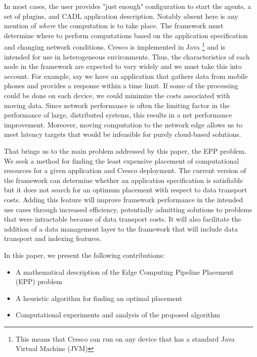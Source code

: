 \documentclass{article}
\begin{document}
    In most cases, the user provides "just enough" configuration to start the agents, a set of plugins, and CADL application description. Notably absent here is any mention of \textit{where} the computation is to take place. The framework must determine where to perform computations based on the application specification and changing network conditions. Cresco is implemented in Java \footnote{This means that Cresco can run on any device that has a standard Java Virtual Machine (JVM)}
    and is intended for use in heterogeneous environments. Thus, the characteristics of each node in the framework are expected to vary widely and we must take this into account. For example, say we have an application that gathers data from mobile phones and provides a response within a time limit. If some of the processing could be done on each device, we could minimize the costs associated with moving data. Since network performance is often the limiting factor in the performance of large, distributed systems, this results in a net performance improvement. Moreover, moving computation to the network edge allows us to meet latency targets that would be infeasible for purely cloud-based solutions.
    
    That brings us to the main problem addressed by this paper, the EPP problem.  We seek a method for finding the least expensive placement of computational resources for a given application and Cresco deployment. The current version of the framework can determine whether an application specification is satisfiable but it does not search for an optimum placement with respect to data transport costs. Adding this feature will improve framework performance in the intended use cases through increased efficiency, potentially admitting solutions to problems that were intractable because of data transport costs. It will also facilitate the addition of a data management layer to the framework that will include data transport and indexing features.
    
    In this paper, we present the following contributions:
    \begin{itemize}
    	\item A mathematical description of the Edge Computing Pipeline Placement (EPP) problem
    	\item A heuristic algorithm for finding an optimal placement
 	    \item Computational experiments and analysis of the proposed algorithm
    \end{itemize}
    
\end{document}
